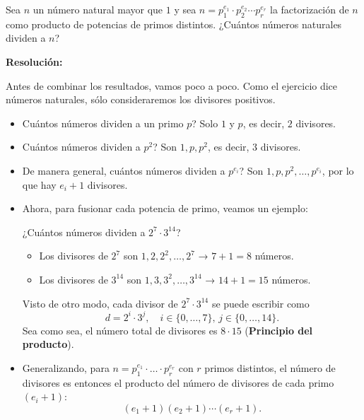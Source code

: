 \documentclass[a4paper,12pt]{article}
\begin{document}
\begin{ejercicio}[title=Ejercicio 6]
Sea $n$ un número natural mayor que $1$ y sea $n = p_1^{e_1} \cdot p_2^{e_2} \cdots p_r^{e_r}$ la factorización de $n$ como producto de potencias de primos distintos. ¿Cuántos números naturales dividen a $n$?

\tcblower
\textbf{Resolución:}

Antes de combinar los resultados, vamos poco a poco. Como el ejercicio dice números naturales, sólo consideraremos los divisores positivos.

\begin{itemize}
\item Cuántos números dividen a un primo $p$?  
Solo $1$ y $p$, es decir, $2$ divisores.

\item Cuántos números dividen a $p^2$?  
Son $1, p, p^2$, es decir, $3$ divisores.

\item De manera general, cuántos números dividen a $p^{e_i}$?  
Son $1,p,p^2,\dots,p^{e_i}$, por lo que hay $e_i + 1$ divisores.

\item Ahora, para fusionar cada potencia de primo, veamos un ejemplo:

¿Cuántos números dividen a $2^7 \cdot 3^{14}$?  
\begin{itemize}
\item Los divisores de $2^7$ son $1, 2, 2^2, \dots, 2^7$ → $7+1 = 8$ números. 
\item Los divisores de $3^{14}$ son $1, 3, 3^2, \dots, 3^{14}$ → $14+1 = 15$ números.
\end{itemize}

Visto de otro modo, cada divisor de $2^7 \cdot 3^{14}$ se puede escribir como 
\[
d = 2^i \cdot 3^j, \quad i \in \{0,\dots,7\}, \, j \in \{0,\dots,14\}.
\]  
Sea como sea, el número total de divisores es $8 \cdot 15$ (\textbf{Principio del producto}).

\item Generalizando, para $n = p_1^{e_1} \cdot \dots \cdot p_r^{e_r}$ con $r$ primos distintos, el número de divisores es entonces el producto del número de divisores de cada primo $(e_i+1)$:
\[
\boxed{(e_1 + 1) (e_2 + 1) \cdots (e_r + 1)}.
\]

\end{itemize}

\end{ejercicio}
\end{document}
